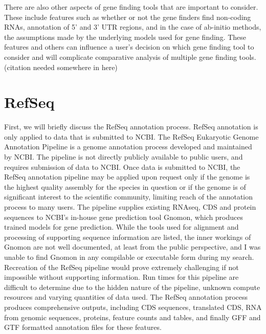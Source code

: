 There are also other aspects of gene finding tools that are important
to consider. These include features such as whether or not the gene
finders find non-coding RNAs, annotation of 5' and 3' UTR regions, and
in the case of ab-initio methods, the assumptions made by the
underlying models used for gene finding. These features and others can
influence a user's decision on which gene finding tool to consider and
will complicate comparative analysis of multiple gene finding
tools. (citation needed somewhere in here)

\section{RefSeq}

First, we will briefly discuss the RefSeq annotation process. RefSeq
annotation is only applied to data that is submitted to NCBI. The
RefSeq Eukaryotic Genome Annotation Pipeline\cite{NCBI2024} is a
genome annotation process developed and maintained by NCBI. The
pipeline is not directly publicly available to public users, and
requires submission of data to NCBI. Once data is submitted to NCBI,
the RefSeq annotation pipeline may be applied upon request only if the
genome is the highest quality assembly for the species in question or
if the genome is of significant interest to the scientific community,
limiting reach of the annotation process to many users. The pipeline
supplies existing RNAseq, CDS and protein sequences to NCBI's in-house
gene prediction tool Gnomon, which produces trained models for gene
prediction. While the tools used for alignment and processing of
supporting sequence information are listed, the inner workings of
Gnomon are not well documented, at least from the public perspective,
and I was unable to find Gnomon in any compilable or executable form
during my search. Recreation of the RefSeq pipeline would prove
extremely challenging if not impossible without supporting
information. Run times for this pipeline are difficult to determine
due to the hidden nature of the pipeline, unknown compute resources
and varying quantities of data used. The RefSeq annotation process
produces comprehensive outputs, including CDS sequences, translated
CDS, RNA from genomic sequences, proteins, feature counts and tables,
and finally GFF and GTF formatted annotation files for these features.

